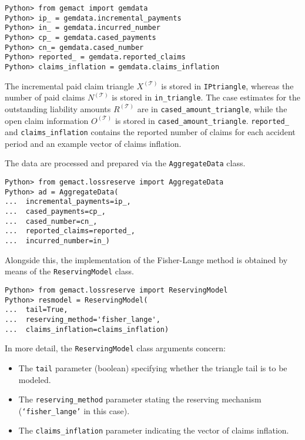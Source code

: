 \documentclass{article}
\begin{document}
\begin{lstlisting}
Python> from gemact import gemdata
Python> ip_ = gemdata.incremental_payments
Python> in_ = gemdata.incurred_number
Python> cp_ = gemdata.cased_payments
Python> cn_= gemdata.cased_number
Python> reported_ = gemdata.reported_claims
Python> claims_inflation = gemdata.claims_inflation
\end{lstlisting}

The incremental paid claim triangle $X^{\mathcal{(T)}}$
is stored in \texttt{IPtriangle}, whereas the number of paid claims $N^{\mathcal{(T)}}$ is stored in \texttt{in\_triangle}. 
The case estimates for the outstanding liability amounts $R^{\mathcal{(T)}}$ are in \texttt{cased\_amount\_triangle}, while the open claim information $O^{\mathcal{(T)}}$ is stored in \texttt{cased\_amount\_triangle}. \texttt{reported\_} and \texttt{claims\_inflation} contains the reported number of claims for each accident period and an example vector of claims inflation.

The data are processed and prepared via the \texttt{AggregateData} class.

\begin{lstlisting}
Python> from gemact.lossreserve import AggregateData
Python> ad = AggregateData(
...  incremental_payments=ip_,
...  cased_payments=cp_,
...  cased_number=cn_,
...  reported_claims=reported_,
...  incurred_number=in_)
\end{lstlisting}

Alongside this, the implementation of the Fisher-Lange method is obtained by means of the \texttt{ReservingModel} class.

\begin{lstlisting}
Python> from gemact.lossreserve import ReservingModel
Python> resmodel = ReservingModel(
...  tail=True,
...  reserving_method='fisher_lange',
...  claims_inflation=claims_inflation)
\end{lstlisting}

In more detail, the \texttt{ReservingModel} class arguments concern:

\begin{itemize}
    \item The \texttt{tail} parameter (boolean) specifying whether the triangle tail is to be modeled.
    \item The \texttt{reserving\_method} parameter stating the reserving mechanism (\texttt{`fisher\_lange'} in this case). 
    \item The \texttt{claims\_inflation} parameter indicating the vector of claims inflation.
\end{itemize}
\end{document}
